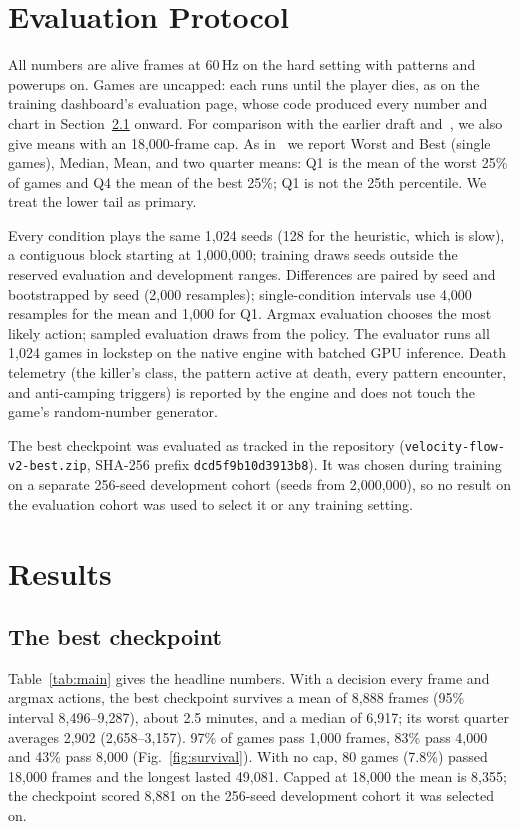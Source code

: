 \documentclass[journal]{IEEEtran}
\begin{document}
\section{Evaluation Protocol}\label{sec:protocol}
All numbers are alive frames at 60\,Hz on the hard setting with patterns and
powerups on. Games are uncapped: each runs until the player dies, as on the
training dashboard's evaluation page, whose code produced every number and
chart in Section~\ref{sec:headline} onward. For comparison with the earlier
draft and~\cite{turner}, we also give means with an 18,000-frame cap. As in~\cite{turner} we
report Worst and Best (single games), Median, Mean, and two quarter means: Q1
is the mean of the worst 25\% of games and Q4 the mean of the best 25\%; Q1 is
not the 25th percentile. We treat the lower tail as primary.

Every condition plays the same 1,024 seeds (128 for the heuristic, which is
slow), a contiguous block starting at 1,000,000; training draws seeds outside
the reserved evaluation and development ranges. Differences are paired by seed
and bootstrapped by seed (2,000 resamples); single-condition intervals use
4,000 resamples for the mean and 1,000 for Q1. Argmax evaluation chooses the most likely action; sampled evaluation
draws from the policy. The evaluator runs all 1,024 games in lockstep on the
native engine with batched GPU inference. Death telemetry (the killer's class,
the pattern active at death, every pattern encounter, and anti-camping
triggers) is reported by the engine and does not touch the game's
random-number generator.

The best checkpoint was evaluated as tracked in the repository
(\texttt{velocity-flow-v2-best.zip}, SHA-256 prefix
\texttt{dcd5f9b10d3913b8}). It was chosen during training on a separate
256-seed development cohort (seeds from 2,000,000), so no result on the
evaluation cohort was used to select it or any training setting.

\section{Results}

\subsection{The best checkpoint}\label{sec:headline}
Table~\ref{tab:main} gives the headline numbers. With a decision every frame
and argmax actions, the best checkpoint survives a mean of 8,888 frames
(95\% interval 8,496--9,287), about 2.5 minutes, and a median of 6,917; its
worst quarter averages 2,902 (2,658--3,157). 97\% of games pass 1,000 frames,
83\% pass 4,000 and 43\% pass 8,000 (Fig.~\ref{fig:survival}). With no cap,
80 games (7.8\%) passed 18,000 frames and the longest lasted 49,081. Capped at
18,000 the mean is 8,355; the checkpoint scored 8,881 on the 256-seed
development cohort it was selected on.
\end{document}
